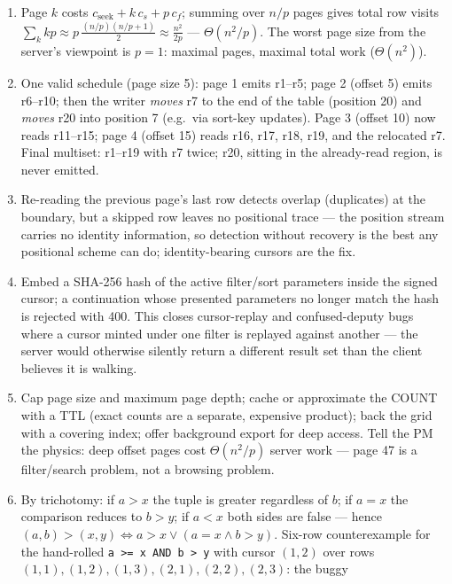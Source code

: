 \begin{enumerate}[label=\textbf{E8.\arabic*.}, leftmargin=2.8em]
  \item Page $k$ costs $c_{\text{seek}} + k\,c_s + p\,c_f$; summing over
    $n/p$ pages gives total row visits
    $\sum_{k} k p \approx p\,\frac{(n/p)(n/p+1)}{2} \approx
    \frac{n^2}{2p}$ --- $\Theta(n^2/p)$. The worst page size from the
    server's viewpoint is $p{=}1$: maximal pages, maximal total work
    ($\Theta(n^2)$).
  \item One valid schedule (page size 5): page 1 emits r1--r5; page 2
    (offset 5) emits r6--r10; then the writer \emph{moves} r7 to the end of
    the table (position 20) and \emph{moves} r20 into position 7 (e.g.\ via
    sort-key updates). Page 3 (offset 10) now reads r11--r15; page 4
    (offset 15) reads r16, r17, r18, r19, and the relocated r7. Final
    multiset: r1--r19 with r7 twice; r20, sitting in the already-read
    region, is never emitted.
  \item Re-reading the previous page's last row detects overlap (duplicates)
    at the boundary, but a skipped row leaves no positional trace --- the
    position stream carries no identity information, so detection without
    recovery is the best any positional scheme can do; identity-bearing
    cursors are the fix.
  \item Embed a SHA-256 hash of the active filter/sort parameters inside the
    signed cursor; a continuation whose presented parameters no longer match
    the hash is rejected with 400. This closes cursor-replay and
    confused-deputy bugs where a cursor minted under one filter is replayed
    against another --- the server would otherwise silently return a
    different result set than the client believes it is walking.
  \item Cap page size and maximum page depth; cache or approximate the
    COUNT with a TTL (exact counts are a separate, expensive product);
    back the grid with a covering index; offer background export for deep
    access. Tell the PM the physics: deep offset pages cost
    $\Theta(n^2/p)$ server work --- page 47 is a filter/search problem, not
    a browsing problem.
  \item By trichotomy: if $a > x$ the tuple is greater regardless of $b$;
    if $a = x$ the comparison reduces to $b > y$; if $a < x$ both sides are
    false --- hence $(a,b)>(x,y) \iff a>x \lor (a=x \land b>y)$. Six-row
    counterexample for the hand-rolled \texttt{a >= x AND b > y} with cursor
    $(1,2)$ over rows $(1,1),(1,2),(1,3),(2,1),(2,2),(2,3)$: the buggy

\end{enumerate}

